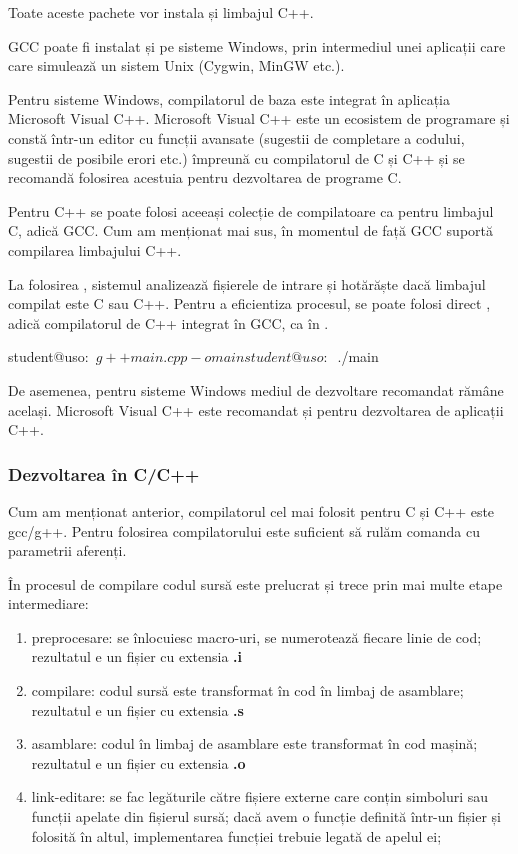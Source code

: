 Toate aceste pachete vor instala și limbajul C++.

GCC poate fi instalat și pe sisteme Windows, prin intermediul unei aplicații care care simulează un sistem Unix (Cygwin, MinGW etc.).

Pentru sisteme Windows, compilatorul de baza este integrat în aplicația Microsoft Visual C++.
Microsoft Visual C++ este un ecosistem de programare și constă într-un editor cu funcții avansate (sugestii de completare a codului, sugestii de posibile erori etc.) împreună cu compilatorul de C și C++ și se recomandă folosirea acestuia pentru dezvoltarea de programe C.

Pentru C++ se poate folosi aceeași colecție de compilatoare ca pentru limbajul C, adică GCC.
Cum am menționat mai sus, în momentul de față GCC suportă compilarea limbajului C++.

La folosirea , sistemul analizează fișierele de intrare și hotărăște dacă limbajul compilat este C sau C++.
Pentru a eficientiza procesul, se poate folosi direct , adică compilatorul de C++ integrat în GCC, ca în .

\begin{screen}[caption={Exemplu compilare si rulare C++},label={lst:appdev:simple-cpp}]
student@uso:~$ g++ main.cpp -o main
student@uso:~$ ./main
\end{screen}

De asemenea, pentru sisteme Windows mediul de dezvoltare recomandat rămâne același.
Microsoft Visual C++ este recomandat și pentru dezvoltarea de aplicații C++.

\subsubsection{Dezvoltarea în C/C++}
\label{sec:appdev:dev-env:c-dev}

Cum am menționat anterior, compilatorul cel mai folosit pentru C și C++ este gcc/g++.
Pentru folosirea compilatorului este suficient să rulăm comanda  cu parametrii aferenți.

În procesul de compilare codul sursă este prelucrat și trece prin mai multe etape intermediare:

\begin{enumerate}
  \item preprocesare: se înlocuiesc macro-uri, se numerotează fiecare linie de cod;
    rezultatul e un fișier cu extensia \textbf{.i}
  \item compilare: codul sursă este transformat în cod în limbaj de asamblare;
    rezultatul e un fișier cu extensia \textbf{.s}
  \item asamblare: codul în limbaj de asamblare este transformat în cod mașină;
    rezultatul e un fișier cu extensia \textbf{.o}
  \item link-editare: se fac legăturile către fișiere externe care conțin simboluri sau funcții apelate din fișierul sursă;
    dacă avem o funcție definită într-un fișier și folosită în altul, implementarea funcției trebuie legată de apelul ei;
\end{enumerate}

